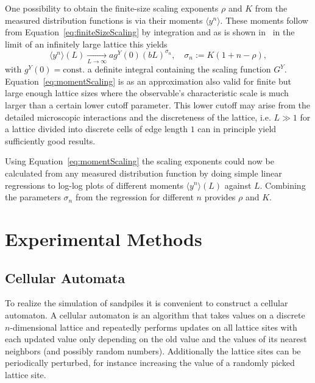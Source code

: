 One possibility to obtain the finite-size scaling exponents $\rho$ and $K$ from the measured distribution functions
is via their moments $\langle y^n\rangle$. These moments follow from Equation~\eqref{eq:finiteSizeScaling} by integration
and as is shown in~\cite{SOC-book} in the limit of an infinitely large lattice this yields
\begin{equation}\label{eq:momentScaling}
\langle y^n\rangle(L) \xrightarrow[L\to\infty]{} a g^{Y}(0) (bL)^{\sigma_n},\quad \sigma_n := K(1+n-\rho),
\end{equation}
with $g^{Y}(0)=\mathrm{const.}$ a definite integral containing the scaling function $G^{Y}$.
Equation~\eqref{eq:momentScaling} is as an approximation also valid for finite but large enough lattice sizes where
the observable's characteristic scale is much larger than a certain lower cutoff parameter. This lower cutoff may arise
from the detailed microscopic interactions and the discreteness of the lattice, i.e. $L \gg 1$ for a lattice divided
into discrete cells of edge length $1$ can in principle yield sufficiently good results.

Using Equation~\eqref{eq:momentScaling} the scaling exponents could now be calculated from any measured distribution
function by doing simple linear regressions to log-log plots of different moments $\langle y^n\rangle (L)$ against $L$.
Combining the parameters $\sigma_n$ from the regression for different $n$ provides $\rho$ and $K$.

\section{Experimental Methods}
\label{sec:experiment}

\subsection{Cellular Automata}
\label{sec:cellularAutomata}
To realize the simulation of sandpiles it is convenient to construct a cellular automaton.
A cellular automaton is an algorithm that takes values on a discrete $n$-dimensional lattice and repeatedly performs
updates on all lattice sites with each updated value only depending on the old value and the values of its nearest
neighbors (and possibly random numbers). Additionally the lattice sites can be periodically perturbed, for instance
increasing the value of a randomly picked lattice site.

